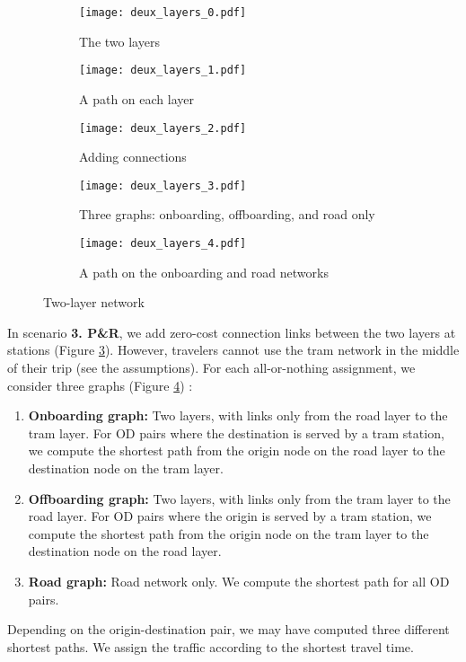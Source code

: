 \begin{figure}
    \centering
    \begin{subfigure}{0.33\textwidth}
        \centering
        \texttt{[image: deux\_layers\_0.pdf]}
        \caption{The two layers}
        \label{fig:2layer_0}
    \end{subfigure}%
    \begin{subfigure}{0.33\textwidth}
        \centering
        \texttt{[image: deux\_layers\_1.pdf]}
        \caption{A path on each layer}
        \label{fig:2layer_1}
    \end{subfigure}
    \begin{subfigure}{0.33\textwidth}
        \centering
        \texttt{[image: deux\_layers\_2.pdf]}
        \caption{Adding connections\\}
        \label{fig:2layer_2}
    \end{subfigure}%
    \begin{subfigure}{0.33\textwidth}
        \centering
        \texttt{[image: deux\_layers\_3.pdf]}
        \caption{Three graphs: onboarding, offboarding, and road only}
        \label{fig:2layer_3}
    \end{subfigure}%
    \begin{subfigure}{0.33\textwidth}
        \centering
        \texttt{[image: deux\_layers\_4.pdf]}
        \caption{A path on the onboarding and road networks}
        \label{fig:2layer_4}
    \end{subfigure}%
    \caption{Two-layer network}
\end{figure}

In scenario \textbf{3. P\&R}, we add zero-cost connection links between the two layers at stations (Figure \ref{fig:2layer_2}). However, travelers cannot use the tram network in the middle of their trip (see the assumptions). For each all-or-nothing assignment, we consider three graphs (Figure \ref{fig:2layer_3}) :
\begin{enumerate}
    \item \textbf{Onboarding graph:} Two layers, with links only from the road layer to the tram layer. For OD pairs where the destination is served by a tram station, we compute the shortest path from the origin node on the road layer to the destination node on the tram layer.
    \item \textbf{Offboarding graph:} Two layers, with links only from the tram layer to the road layer. For OD pairs where the origin is served by a tram station, we compute the shortest path from the origin node on the tram layer to the destination node on the road layer.
    \item \textbf{Road graph:} Road network only. We compute the shortest path for all OD pairs.
\end{enumerate}

Depending on the origin-destination pair, we may have computed three different shortest paths. We assign the traffic according to the shortest travel time.


